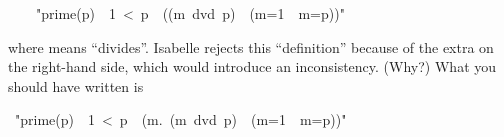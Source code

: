 \begin{isabelle}%
\isanewline
~~~~{"}prime(p)~{\isasymequiv}~1~<~p~{\isasymand}~((m~dvd~p)~{\isasymlongrightarrow}~(m=1~{\isasymor}~m=p)){"}%
\begin{isamarkuptext}%
\noindent\small
where  means ``divides''.
Isabelle rejects this ``definition'' because of the extra  on the
right-hand side, which would introduce an inconsistency. (Why?) What you
should have written is%
\end{isamarkuptext}%
~{"}prime(p)~{\isasymequiv}~1~<~p~{\isasymand}~({\isasymforall}m.~(m~dvd~p)~{\isasymlongrightarrow}~(m=1~{\isasymor}~m=p)){"}\end{isabelle}%
